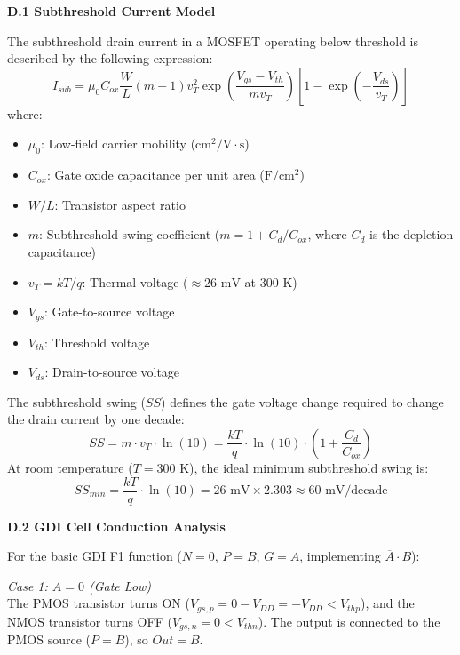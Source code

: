\documentclass[12pt,a4paper,oneside]{report}
\begin{document}
\noindent\textbf{D.1 Subthreshold Current Model}

\noindent The subthreshold drain current in a MOSFET operating below threshold is described by the following expression:
\begin{equation}
I_{sub} = \mu_0 C_{ox} \frac{W}{L} (m-1) v_T^2 \exp\left(\frac{V_{gs} - V_{th}}{m v_T}\right) \left[1 - \exp\left(-\frac{V_{ds}}{v_T}\right)\right]
\end{equation}
where:
\begin{itemize}
\item $\mu_0$: Low-field carrier mobility ($\text{cm}^2/\text{V}\cdot\text{s}$)
\item $C_{ox}$: Gate oxide capacitance per unit area ($\text{F}/\text{cm}^2$)
\item $W/L$: Transistor aspect ratio
\item $m$: Subthreshold swing coefficient ($m = 1 + C_d/C_{ox}$, where $C_d$ is the depletion capacitance)
\item $v_T = kT/q$: Thermal voltage ($\approx 26\text{ mV}$ at $300\text{ K}$)
\item $V_{gs}$: Gate-to-source voltage
\item $V_{th}$: Threshold voltage
\item $V_{ds}$: Drain-to-source voltage
\end{itemize}

The subthreshold swing ($SS$) defines the gate voltage change required to change the drain current by one decade:
\begin{equation}
SS = m \cdot v_T \cdot \ln(10) = \frac{kT}{q} \cdot \ln(10) \cdot \left(1 + \frac{C_d}{C_{ox}}\right)
\end{equation}
At room temperature ($T = 300\text{ K}$), the ideal minimum subthreshold swing is:
\begin{equation}
SS_{min} = \frac{kT}{q} \cdot \ln(10) = 26\text{ mV} \times 2.303 \approx 60\text{ mV/decade}
\end{equation}

\vspace{0.5cm}
\noindent\textbf{D.2 GDI Cell Conduction Analysis}

\noindent For the basic GDI F1 function ($N=0$, $P=B$, $G=A$, implementing $\overline{A} \cdot B$):

\noindent\textit{Case 1: $A = 0$ (Gate Low)}\\
The PMOS transistor turns ON ($V_{gs,p} = 0 - V_{DD} = -V_{DD} < V_{thp}$), and the NMOS transistor turns OFF ($V_{gs,n} = 0 < V_{thn}$). The output is connected to the PMOS source ($P = B$), so $Out = B$.
\end{document}
